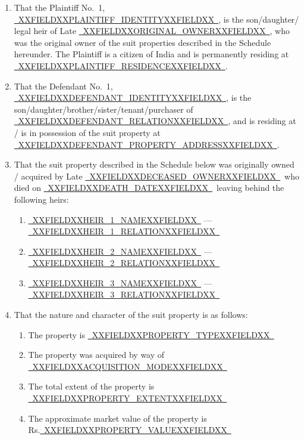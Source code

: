 \documentclass[12pt,a4paper]{article}
\newcommand{\fillline}[1]{\underline{~#1~}}
\begin{document}
\begin{enumerate}[leftmargin=*, label=\arabic{enumi}., itemsep=12pt, topsep=2pt]

  \item That the Plaintiff No.~1, \fillline{XXFIELDXXPLAINTIFF_IDENTITYXXFIELDXX}, is the son/daughter/
        legal heir of Late \fillline{XXFIELDXXORIGINAL_OWNERXXFIELDXX}, who was the original owner of the suit
        properties described in the Schedule hereunder. The Plaintiff is a citizen of India and is
        permanently residing at \fillline{XXFIELDXXPLAINTIFF_RESIDENCEXXFIELDXX}.

  \item That the Defendant No.~1, \fillline{XXFIELDXXDEFENDANT_IDENTITYXXFIELDXX}, is the
        son/daughter/brother/sister/tenant/purchaser of
        \fillline{XXFIELDXXDEFENDANT_RELATIONXXFIELDXX}, and is residing at / is in possession of the
        suit property at \fillline{XXFIELDXXDEFENDANT_PROPERTY_ADDRESSXXFIELDXX}.

  \item That the suit property described in the Schedule below was
        originally owned / acquired by Late \fillline{XXFIELDXXDECEASED_OWNERXXFIELDXX}\ who died on
        \fillline{XXFIELDXXDEATH_DATEXXFIELDXX}\ leaving behind the following heirs:
        \begin{enumerate}[label=(\alph*), itemsep=4pt]
          \item \fillline{XXFIELDXXHEIR_1_NAMEXXFIELDXX} --- \fillline{XXFIELDXXHEIR_1_RELATIONXXFIELDXX}
          \item \fillline{XXFIELDXXHEIR_2_NAMEXXFIELDXX} --- \fillline{XXFIELDXXHEIR_2_RELATIONXXFIELDXX}
          \item \fillline{XXFIELDXXHEIR_3_NAMEXXFIELDXX} --- \fillline{XXFIELDXXHEIR_3_RELATIONXXFIELDXX}
        \end{enumerate}

  \item That the nature and character of the suit property is as follows:
        \begin{enumerate}[label=(\alph*), itemsep=4pt]
          \item The property is \fillline{XXFIELDXXPROPERTY_TYPEXXFIELDXX}
          \item The property was acquired by way of \fillline{XXFIELDXXACQUISITION_MODEXXFIELDXX}
          \item The total extent of the property is \fillline{XXFIELDXXPROPERTY_EXTENTXXFIELDXX}
          \item The approximate market value of the property is Rs.\fillline{XXFIELDXXPROPERTY_VALUEXXFIELDXX}
        \end{enumerate}


\end{enumerate}
\end{document}

